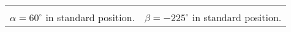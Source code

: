 \documentclass[12pt]{ximera}
\begin{document}
\begin{example}
\begin{enumerate}
\begin{center}
\begin{tabular}{cc}

\scriptsize
\normalsize


&

\hspace{.5in}

\scriptsize
\normalsize
 

\\

$\alpha = 60^{\circ}$ in standard position. & \hspace{1in} $\beta = -225^{\circ}$ in standard position.\\

\end{tabular}


\end{center}
\end{enumerate}
\end{example}
\end{document}
